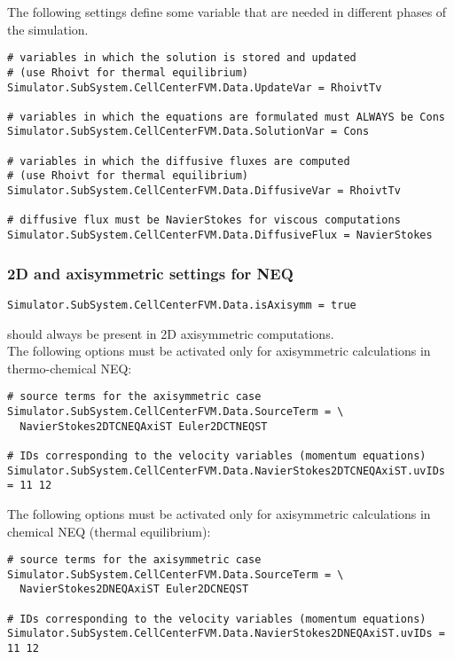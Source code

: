 \documentclass[11pt]{article}
\begin{document}
The following settings define some variable that are needed in different phases of the simulation.

\begin{verbatim}
# variables in which the solution is stored and updated 
# (use Rhoivt for thermal equilibrium)
Simulator.SubSystem.CellCenterFVM.Data.UpdateVar = RhoivtTv

# variables in which the equations are formulated must ALWAYS be Cons
Simulator.SubSystem.CellCenterFVM.Data.SolutionVar = Cons

# variables in which the diffusive fluxes are computed 
# (use Rhoivt for thermal equilibrium)
Simulator.SubSystem.CellCenterFVM.Data.DiffusiveVar = RhoivtTv

# diffusive flux must be NavierStokes for viscous computations
Simulator.SubSystem.CellCenterFVM.Data.DiffusiveFlux = NavierStokes
\end{verbatim}

\subsubsection{2D and axisymmetric settings for NEQ}

\begin{verbatim}
Simulator.SubSystem.CellCenterFVM.Data.isAxisymm = true
\end{verbatim}
should always be present in 2D axisymmetric computations. \\

The following options must be activated only for axisymmetric calculations in thermo-chemical NEQ:

\begin{verbatim}
# source terms for the axisymmetric case
Simulator.SubSystem.CellCenterFVM.Data.SourceTerm = \
  NavierStokes2DTCNEQAxiST Euler2DCTNEQST

# IDs corresponding to the velocity variables (momentum equations) 
Simulator.SubSystem.CellCenterFVM.Data.NavierStokes2DTCNEQAxiST.uvIDs = 11 12
\end{verbatim}

The following options must be activated only for axisymmetric calculations in chemical NEQ (thermal equilibrium):

\begin{verbatim}
# source terms for the axisymmetric case
Simulator.SubSystem.CellCenterFVM.Data.SourceTerm = \
  NavierStokes2DNEQAxiST Euler2DCNEQST

# IDs corresponding to the velocity variables (momentum equations) 
Simulator.SubSystem.CellCenterFVM.Data.NavierStokes2DNEQAxiST.uvIDs = 11 12
\end{verbatim}
\end{document}
